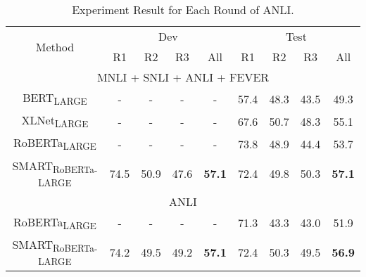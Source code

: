 \documentclass[11pt]{article} \usepackage{url}
\begin{document}
\begin{table*}[htb!]
    \centering
    \begin{tabular}{c|c|c|c|c|c|c|c|c}
    \hline
         \multirow{2}{*}{Method} & \multicolumn{4}{c|}{Dev} & \multicolumn{4}{c}{Test}  \\
         \cline{2-9}
          &  R1 & R2 & R3 & All & R1 & R2 & R3 & All  \\
          \hline 
 		\multicolumn{9}{c}{ MNLI + SNLI + ANLI + FEVER  }  \\ \hline
          BERT\textsubscript{LARGE}  \citep{nie2019adversarial}  &-&-&-& - &57.4&48.3&43.5& 49.3 \\
		\hline
		XLNet\textsubscript{LARGE} \citep{nie2019adversarial}  &-&-&-& -  &67.6&50.7&48.3& 55.1\\
		\hline
		RoBERTa\textsubscript{LARGE} \citep{nie2019adversarial}  &-&-&-& - &73.8&48.9&44.4& 53.7\\
		\hline 
		SMART\textsubscript{RoBERTa-LARGE}  & 74.5&50.9&47.6& \textbf{57.1} &72.4&49.8&50.3& \textbf{57.1} \\ \hline \hline
 		\multicolumn{9}{c}{ ANLI }  \\ 
 		\hline
 		RoBERTa\textsubscript{LARGE} \citep{nie2019adversarial} &-&-&-& -  & 71.3&43.3&43.0& 51.9 \\ 		\hline 
SMART\textsubscript{RoBERTa-LARGE}  &74.2&49.5&49.2& \textbf{57.1} &72.4&50.3&49.5& \textbf{56.9}\\
\hline
    \end{tabular}
    \caption{Experiment Result for Each Round of ANLI.}
    \label{tab:anli_full}
\end{table*}
\end{document}
